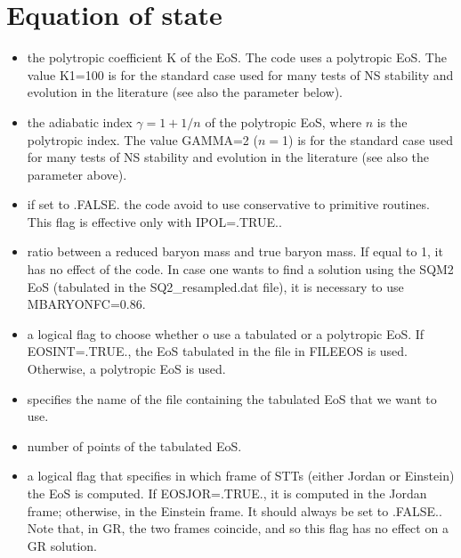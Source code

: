 \documentclass[letterpaper,10pt,english]{sphinxmanual}
\begin{document}
\section{Equation of state}
\label{\detokenize{user_params:equation-of-state}}\begin{itemize}
\item {} 
\sphinxAtStartPar
{} \sphinxhyphen{} the polytropic coefficient K of the EoS. The code uses a polytropic EoS. The value K1=100 is
for the standard case used for many tests of NS stability and evolution in the literature (see also the
parameter below).


\item {} 
\sphinxAtStartPar
{} \sphinxhyphen{} the adiabatic index \(\gamma = 1 + 1/n\) of the polytropic EoS, where \(n\) is the polytropic index. The
value GAMMA=2 (\(n = \)1) is for the standard case used for many tests of NS stability and evolution in
the literature (see also the parameter above).


\item {} 
\sphinxAtStartPar
{} \sphinxhyphen{} if set to .FALSE. the code avoid to use conservative to primitive routines. This flag is effective
only with IPOL=.TRUE..


\item {} 
\sphinxAtStartPar
{} \sphinxhyphen{} ratio between a reduced baryon mass and true baryon mass. If equal to 1, it has no effect of the code. In case one wants to find a solution using the SQM2 EoS (tabulated in the SQ2\_resampled.dat file), it is necessary to use MBARYONFC=0.86.


\item {} 
\sphinxAtStartPar
{} \sphinxhyphen{} a logical flag to choose whether o use a tabulated or a polytropic EoS. If EOSINT=.TRUE., the EoS tabulated in the file in FILEEOS is used. Otherwise, a polytropic EoS is used.


\item {} 
\sphinxAtStartPar
{} \sphinxhyphen{} specifies the name of the file containing the tabulated EoS that we want to use.


\item {} 
\sphinxAtStartPar
{} \sphinxhyphen{} number of points of the tabulated EoS.


\item {} 
\sphinxAtStartPar
{} \sphinxhyphen{} a logical flag that specifies in which frame of STTs (either Jordan or Einstein) the EoS is computed. If EOSJOR=.TRUE., it is computed in the Jordan frame; otherwise, in the Einstein frame. It should always be set to .FALSE.. Note that, in GR, the two frames coincide, and so this flag has no effect on a GR solution.

\end{itemize}
\end{document}
